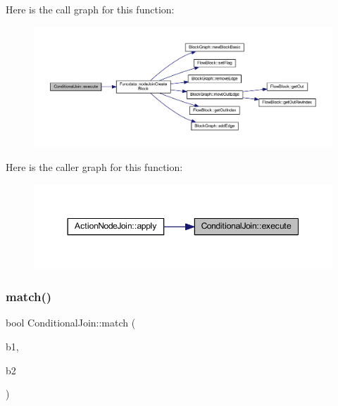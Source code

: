 Here is the call graph for this function\+:
\nopagebreak
\begin{figure}[H]
\begin{center}
\leavevmode
\includegraphics[width=350pt]{class_conditional_join_a7ddeb5ef416cda6bec2ca424b22e00a7_cgraph}
\end{center}
\end{figure}
Here is the caller graph for this function\+:
\nopagebreak
\begin{figure}[H]
\begin{center}
\leavevmode
\includegraphics[width=350pt]{class_conditional_join_a7ddeb5ef416cda6bec2ca424b22e00a7_icgraph}
\end{center}
\end{figure}
\mbox{\label{class_conditional_join_ab4f86556c6387f177e341329ed346e99}} 
\subsubsection{\texorpdfstring{match()}{match()}}
{\footnotesize\ttfamily bool Conditional\+Join\+::match (\begin{DoxyParamCaption}\item[{\mbox{\hyperlink{class_block_basic}{Block\+Basic}} $\ast$}]{b1,  }\item[{\mbox{\hyperlink{class_block_basic}{Block\+Basic}} $\ast$}]{b2 }\end{DoxyParamCaption})}



